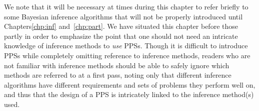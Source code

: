 We note that it will be necessary at times during this chapter to refer briefly to some Bayesian inference
algorithms that will not be properly introduced until Chapters\ref{chp:inf} and~\ref{chp:part}.  
We have situated this chapter before those partly in order to emphasize the point that one should not 
need an intricate knowledge of inference methods to \emph{use} PPSs.  Though it is difficult
to introduce PPSs while completely omitting reference to inference methods, readers who
are not familiar with inference methods should be able to safely ignore which methods are referred to
at a first pass, noting only that different inference algorithms have different requirements and sets 
of problems they perform well on, and thus that the design of a PPS is intricately linked to the inference
method(s) used.







%
%

